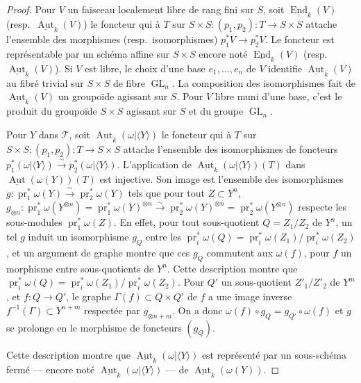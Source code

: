 \documentclass[12pt,a4paper]{article}
\theoremstyle{plain}
\theoremstyle{definition}
\DeclareMathOperator{\End}{End}
\DeclareMathOperator{\Aut}{Aut}
\DeclareMathOperator{\pr}{pr}
\DeclareMathOperator{\GL}{GL}
\begin{document}
\begin{proof}
Pour $V$ un faisceau localement libre de rang fini sur $S$, soit $\underline{\End}_k(V)$ (resp.~$\underline{\Aut}_k(V)$) le foncteur qui à $T$ sur $S \times S : (p_1, p_2) : T \to S \times S$ attache l'ensemble des morphismes (resp.~isomorphismes) $p_1^*V \to p_2^*V$. Le foncteur est représentable par un schéma affine sur $S \times S$ encore noté $\underline{\End}_k(V)$ (resp.~$\underline{\Aut}_k(V)$). Si $V$ est libre, le choix d'une base $e_1, \ldots, e_n$ de $V$ identifie $\underline{\Aut}_k(V)$ au fibré trivial sur $S \times S$ de fibre $\GL_n$. La composition des isomorphismes fait de $\underline{\Aut}_k(V)$ un groupoïde agissant sur $S$. Pour $V$ libre muni d'une base, c'est le produit du groupoïde $S \times S$ agissant sur $S$ et du groupe $\GL_n$.

Pour $Y$ dans $\mathcal{T}$, soit $\underline{\Aut}_k(\omega|\langle Y \rangle)$ le foncteur qui à $T$ sur $S \times S : (p_1, p_2) : T \to S \times S$ attache l'ensemble des isomorphismes de foncteurs $p_1^*(\omega|\langle Y \rangle) \xrightarrow{\sim} p_2^*(\omega|\langle Y \rangle)$. L'application de $\underline{\Aut}_k(\omega|\langle Y \rangle)(T)$ dans $\underline{\Aut}(\omega(Y))(T)$ est injective. Son image est l'ensemble des isomorphismes $g : \pr_1^*\omega(Y) \xrightarrow{\sim} \pr_2^*\omega(Y)$ tels que pour tout $Z \subset Y^n$, $g_{\otimes n} : \pr_1^*\omega(Y^{\otimes n}) = \pr_1^*\omega(Y)^{\otimes n} \xrightarrow{\sim} \pr_2^*\omega(Y)^{\otimes n} = \pr_2^*\omega(Y^{\otimes n})$ respecte les sous-modules $\pr_1^*\omega(Z)$. En effet, pour tout sous-quotient $Q = Z_1/Z_2$ de $Y^n$, un tel $g$ induit un isomorphisme $g_Q$ entre les $\pr_i^*\omega(Q) = \pr_i^*\omega(Z_1)/\pr_i^*\omega(Z_2)$, et un argument de graphe montre que ces $g_Q$ commutent aux $\omega(f)$, pour $f$ un morphisme entre sous-quotients de $Y^n$. Cette description montre que $\pr_i^*\omega(Q) = \pr_i^*\omega(Z_1)/\pr_i^*\omega(Z_2)$. Pour $Q'$ un sous-quotient $Z'_1/Z'_2$ de $Y^m$, et $f : Q \to Q'$, le graphe $\Gamma(f) \subset Q \times Q'$ de $f$ a une image inverse $f^{-1}(\Gamma) \subset Y^{n+m}$ respectée par $g_{\otimes n+m}$. On a donc $\omega(f) \circ g_Q = g_{Q'} \circ \omega(f)$ et $g$ se prolonge en le morphisme de foncteurs $(g_Q)$.

Cette description montre que $\underline{\Aut}_k(\omega|\langle Y \rangle)$ est représenté par un sous-schéma fermé --- encore noté $\underline{\Aut}_k(\omega|\langle Y \rangle)$ --- de $\underline{\Aut}_k(\omega(Y))$.


\end{proof}
\end{document}
